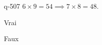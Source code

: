 \begin{truefalse}{q-507}
$6\times 9 = 54 \implies 7\times 8 = 48$.
\item Vrai
\item* Faux
\end{truefalse}

